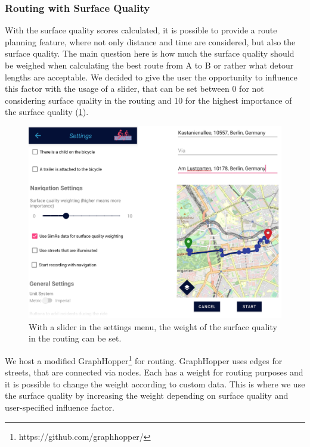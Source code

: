 \subsubsection{Routing with Surface Quality}
\label{subsubsec:routing_with_surface_quality}
With the surface quality scores calculated, it is possible to provide a route planning feature, where not only distance and time are considered, but also the surface quality.
The main question here is how much the surface quality should be weighed when calculating the best route from A to B or rather what detour lengths are acceptable.
We decided to give the user the opportunity to influence this factor with the usage of a slider, that can be set between 0 for not considering surface quality in the routing and 10 for the highest importance of the surface quality (\cref{fig:routing}).
 \begin{figure}
    \centering
    \includegraphics[width=\columnwidth]{fig/routing_settings_2.png}
    \caption{%
With a slider in the settings menu, the weight of the surface quality in the routing can be set.}%
    \label{fig:routing}
\end{figure}
We host a modified GraphHopper\footnote{https://github.com/graphhopper/} for routing.
GraphHopper uses edges for streets, that are connected via nodes.
Each has a weight for routing purposes and it is possible to change the weight according to custom data.
This is where we use the surface quality by increasing the weight depending on surface quality and user-specified influence factor.

